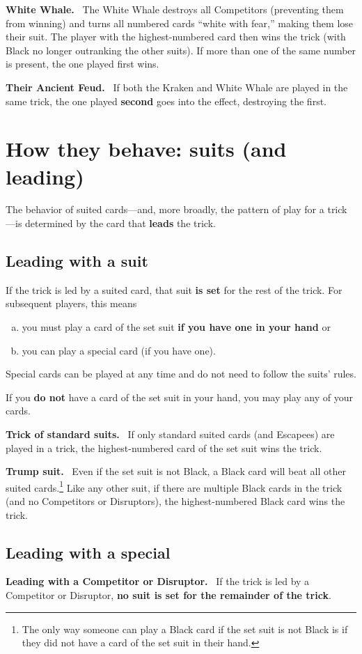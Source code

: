 \documentclass{article}
\newcommand{\Black}{Black}
\newcommand{\block}[2][\medskip]{#1\noindent\textbf{#2.}\ }
\begin{document}
\block{White Whale}
The White Whale destroys all Competitors (preventing them from winning) and turns all numbered cards ``white with fear,'' making them lose their suit. The player with the highest-numbered card then wins the trick (with \Black{} no longer outranking the other suits).  If more than one of the same number is present, the one played first wins.

\block{Their Ancient Feud}
If both the Kraken and White Whale are played in the same trick, the one played \textbf{second} goes into the effect, destroying the first.

\section{How they behave: suits (and leading)}
The behavior of suited cards---and, more broadly, the pattern of play for a trick---is determined by the card that \textbf{leads} the trick.
\subsection{Leading with a suit}
If the trick is led by a suited card, that suit \textbf{is set} for the rest of the trick. For subsequent players, this means
\begin{enumerate}[(a)]
\item you must play a card of the set suit \textbf{if you have one in your hand} or
\item you can play a special card (if you have one). 
\end{enumerate}
Special cards can be played at any time and do not need to follow the suits' rules.

If you \textbf{do not} have a card of the set suit in your hand, you may play any of your cards.

\block{Trick of standard suits} 
If only standard suited cards (and Escapees) are played in a trick, the highest-numbered card of the set suit wins the trick.

\block{Trump suit}
Even if the set suit is not \Black{}, a \Black{} card will beat all other suited cards.\footnote{The only way someone can play a \Black{} card if the set suit is not \Black{} is if they did not have a card of the set suit in their hand.}
Like any other suit, if there are multiple \Black{} cards in the trick (and no Competitors or Disruptors), the highest-numbered \Black{} card wins the trick.

\subsection{Leading with a special}
\block[]{Leading with a Competitor or Disruptor}
If the trick is led by a Competitor or Disruptor, \textbf{no suit is set for the remainder of the trick}.
\end{document}
